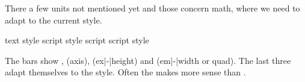\startplacefigure[reference=fig:userunits,title={Shared user units in \TEX\ and \METAFUN.}]
    \getbuffer
\stopplacefigure

There a few units not mentioned yet and those concern math, where we need to adapt to
the current style.

\protected{}

\startlinecorrection
\startcombination[nx=3,ny=1]
    {\scale[scale=6000]{\ShowMathUnits\textstyle}}         {text style}
    {\scale[scale=6000]{\ShowMathUnits\scriptstyle}}       {script style}
    {\scale[scale=6000]{\ShowMathUnits\scriptscriptstyle}} {script script style}
\stopcombination
\stoplinecorrection

The bars show \type {1ex},  (axis),  (ex|-|height) and
 (em|-|width or quad). The last three adapt themselves to the style.
Often the  makes more sense than .

\stopsectionlevel

\page

\stopdocument
